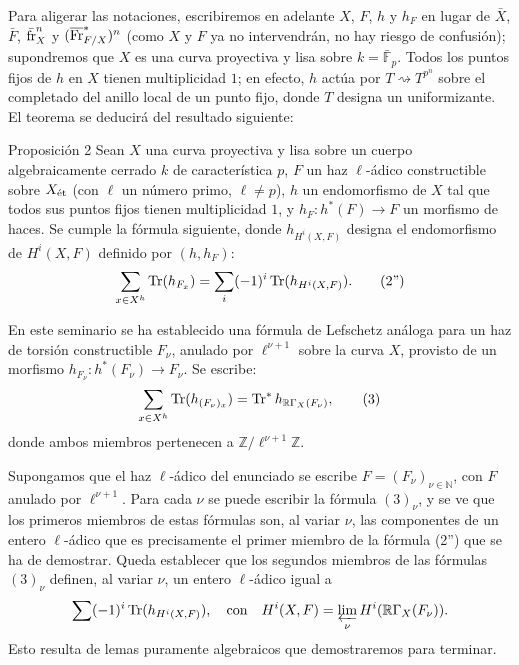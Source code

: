 Para aligerar las notaciones, escribiremos en adelante $X$, $F$, $h$ y $h_F$ en lugar de $\bar X$, $\bar F$, $\bar{\operatorname{fr}}_X^n$ y $(\overline{\operatorname{Fr}}^*_{F/X})^n$ (como $X$ y $F$ ya no intervendrán, no hay riesgo de confusión); supondremos que $X$ es una curva proyectiva y lisa sobre $k=\bar{\mathbb F}_p$. Todos los puntos fijos de $h$ en $X$ tienen multiplicidad $1$; en efecto, $h$ actúa por $T\rightsquigarrow T^{p^n}$ sobre el completado del anillo local de un punto fijo, donde $T$ designa un uniformizante. El teorema se deducirá del resultado siguiente:

\begin{statement}{Proposición 2}
Sean $X$ una curva proyectiva y lisa sobre un cuerpo algebraicamente cerrado $k$ de característica $p$, $F$ un haz $\ell$-ádico constructible sobre $X_{\mathrm{\acute{e}t}}$ (con $\ell$ un número primo, $\ell\ne p$), $h$ un endomorfismo de $X$ tal que todos sus puntos fijos tienen multiplicidad $1$, y $h_F:h^*(F)\to F$ un morfismo de haces. Se cumple la fórmula siguiente, donde $h_{H^i(X,F)}$ designa el endomorfismo de $H^i(X,F)$ definido por $(h,h_F)$:
\[
\sum_{x\in X^h}\operatorname{Tr}(h_{F_x})=\sum_i(-1)^i\operatorname{Tr}(h_{H^i(X,F)}).
\tag{2''}
\]
\end{statement}

En este seminario se ha establecido una fórmula de Lefschetz análoga para un haz de torsión constructible $F_\nu$, anulado por $\ell^{\nu+1}$ sobre la curva $X$, provisto de un morfismo $h_{F_\nu}:h^*(F_\nu)\to F_\nu$. Se escribe:
\[
\sum_{x\in X^h}\operatorname{Tr}(h_{(F_\nu)_x})=\operatorname{Tr}^*h_{\mathbb{R}\Gamma_X(F_\nu)},
\tag{3}
\]
donde ambos miembros pertenecen a $\mathbb Z/\ell^{\nu+1}\mathbb Z$.

Supongamos que el haz $\ell$-ádico del enunciado se escribe $F=(F_\nu)_{\nu\in\mathbb N}$, con $F$ anulado por $\ell^{\nu+1}$. Para cada $\nu$ se puede escribir la fórmula $(3)_\nu$, y se ve que los primeros miembros de estas fórmulas son, al variar $\nu$, las componentes de un entero $\ell$-ádico que es precisamente el primer miembro de la fórmula (2'') que se ha de demostrar. Queda establecer que los segundos miembros de las fórmulas $(3)_\nu$ definen, al variar $\nu$, un entero $\ell$-ádico igual a
\[
\sum(-1)^i\operatorname{Tr}(h_{H^i(X,F)}),
\quad\text{con}\quad
H^i(X,F)=\varprojlim_\nu H^i(\mathbb{R}\Gamma_X(F_\nu)).
\]
Esto resulta de lemas puramente algebraicos que demostraremos para terminar.
